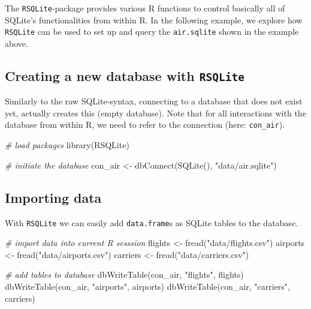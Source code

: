 \documentclass[
  12pt,
]{style/krantz}
\newenvironment{Shaded}{\begin{snugshade}}{\end{snugshade}}
\newcommand{\CommentTok}[1]{\textcolor[rgb]{0.56,0.35,0.01}{\textit{#1}}}
\newcommand{\FunctionTok}[1]{\textcolor[rgb]{0.00,0.00,0.00}{#1}}
\newcommand{\NormalTok}[1]{#1}
\newcommand{\OtherTok}[1]{\textcolor[rgb]{0.56,0.35,0.01}{#1}}
\newcommand{\StringTok}[1]{\textcolor[rgb]{0.31,0.60,0.02}{#1}}
\begin{document}
The \texttt{RSQLite}-package provides various R functions to control basically all of SQLite's functionalities from within R. In the following example, we explore how \texttt{RSQLite} can be used to set up and query the \texttt{air.sqlite} shown in the example above.

\hypertarget{creating-a-new-database-with-rsqlite}{%
\subsection{\texorpdfstring{Creating a new database with \texttt{RSQLite}}{Creating a new database with RSQLite}}\label{creating-a-new-database-with-rsqlite}}

Similarly to the raw SQLite-syntax, connecting to a database that does not exist yet, actually creates this (empty database). Note that for all interactions with the database from within R, we need to refer to the connection (here: \texttt{con\_air}).

\begin{Shaded}
\begin{Highlighting}[]
\CommentTok{\# load packages}
\FunctionTok{library}\NormalTok{(RSQLite)}

\CommentTok{\# initiate the database}
\NormalTok{con\_air }\OtherTok{\textless{}{-}} \FunctionTok{dbConnect}\NormalTok{(}\FunctionTok{SQLite}\NormalTok{(), }\StringTok{"data/air.sqlite"}\NormalTok{)}
\end{Highlighting}
\end{Shaded}

\hypertarget{importing-data}{%
\subsection{Importing data}\label{importing-data}}

With \texttt{RSQLite} we can easily add \texttt{data.frame}s as SQLite tables to the database.

\begin{Shaded}
\begin{Highlighting}[]
\CommentTok{\# import data into current R sesssion}
\NormalTok{flights }\OtherTok{\textless{}{-}} \FunctionTok{fread}\NormalTok{(}\StringTok{"data/flights.csv"}\NormalTok{)}
\NormalTok{airports }\OtherTok{\textless{}{-}} \FunctionTok{fread}\NormalTok{(}\StringTok{"data/airports.csv"}\NormalTok{)}
\NormalTok{carriers }\OtherTok{\textless{}{-}} \FunctionTok{fread}\NormalTok{(}\StringTok{"data/carriers.csv"}\NormalTok{)}

\CommentTok{\# add tables to database}
\FunctionTok{dbWriteTable}\NormalTok{(con\_air, }\StringTok{"flights"}\NormalTok{, flights)}
\FunctionTok{dbWriteTable}\NormalTok{(con\_air, }\StringTok{"airports"}\NormalTok{, airports)}
\FunctionTok{dbWriteTable}\NormalTok{(con\_air, }\StringTok{"carriers"}\NormalTok{, carriers)}
\end{Highlighting}
\end{Shaded}
\end{document}

